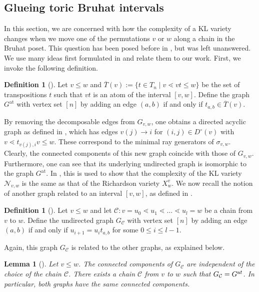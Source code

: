 \documentclass[11pt]{amsart}
\newtheorem{lemma}[theorem]{Lemma}
\theoremstyle{definition}
\theoremstyle{definition}
\newtheorem{definition}[theorem]{Definition}
\theoremstyle{definition}
\theoremstyle{definition}
\newcommand{\Gvwt}{G_{v,w}}
\newcommand{\Nvw}{\mathcal{N}_{v,w}}
\newcommand{\Dc}{D^{\circ}}
\begin{document}
\subsection{Glueing toric Bruhat intervals}\label{subsec: glueing toric intervals}
In this section, we are concerned with how the complexity of a KL variety changes when we move one of the permutations $v$ or $w$ along a chain in the Bruhat poset. This question has been posed before in \cite[Section 5.4]{donten2021complexity}, but was left unanswered.
We use many ideas first formulated in \cite{tsukerman2015} and relate them to our work. First, we invoke the following definition. 
\begin{definition}[{\cite[Definition 4.9]{tsukerman2015}}]
Let $v \leq w$ and $\overline{T}(v):= \{ t \in T_n \mid v \lessdot vt \leq w \}$ be the set of transpositions $t$ such that $vt$ is an atom of the interval $[v,w]$. Define the graph \emph{$G^{\textrm{at}}$} with vertex set $[n]$ by adding an edge $(a,b)$ if and only if $t_{a,b} \in \overline{T}(v)$.
\end{definition}
\noindent 
By removing the decomposable edges from $\Gvwt$, one obtains a directed acyclic graph as defined in \cite[Definition 4.14]{donten2021complexity}, which has edges 
$v(j)\rightarrow i$ for 
$(i,j) \in \Dc(v)$ with
$v \lessdot t_{v(j),i}v \leq w$. These correspond to the minimal ray generators of $\sigma_{v,w}$. Clearly, the connected components of this new graph coincide with those of $\Gvwt$. Furthermore, one can see that its underlying undirected graph is isomorphic to the graph $G^{\textrm{at}}$. In \cite[Corollary 4.16]{donten2021complexity}, this is used to show that the complexity of the KL variety $\Nvw$ is the same as that of the Richardson variety $X^v_w$.
We now recall the notion of another graph related to an interval $[v,w]$, as defined in \cite{tsukerman2015}.
\begin{definition}[{\cite[Definition 4.5]{tsukerman2015}}]
    Let $v \leq w$ and let $\mathcal C: v= u_0 \lessdot u_1 \lessdot \ldots \lessdot u_l =w$ be a chain from $v$ to $w$. Define the undirected graph $G_{\mathcal C}$ with vertex set $[n]$ by adding an edge $(a,b)$ if and only if $u_{i+1} = u_i t_{a,b}$ for some $0 \leq i \leq l-1$.
\end{definition}

\noindent Again, this graph $G_{\mathcal C}$ is related to the other graphs, as explained below.

\begin{lemma}[{\cite[Corollary 4.8, Corollary 3.13, Proposition 4.10]{tsukerman2015}}]
    Let $v \leq w$. The connected components of $G_{\mathcal C}$ are independent of the choice of the chain $\mathcal C$. 
    There exists a chain $\mathcal C$ from $v$ to $w$ such that $G_{\mathcal C} = G^{\textrm at}$. In particular, both graphs have the same connected components.
\end{lemma}
\end{document}
